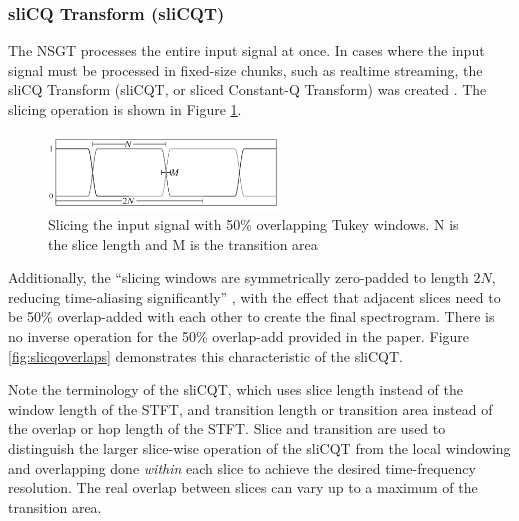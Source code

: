 \documentclass[report.tex]{subfiles}
\begin{document}
\newpagefill

\subsubsection{sliCQ Transform (sliCQT)}
\label{sec:theoryslicqt}

The NSGT processes the entire input signal at once. In cases where the input signal must be processed in fixed-size chunks, such as realtime streaming, the sliCQ Transform (sliCQT, or sliced Constant-Q Transform) was created \parencite{invertiblecqt, slicq}. The slicing operation is shown in Figure \ref{fig:slicqtukeys}.

\begin{figure}[ht]
	\centering
	\includegraphics[width=0.55\textwidth]{./images-misc/slicq_windows.png}
	\caption{Slicing the input signal with 50\% overlapping Tukey windows. N is the slice length and M is the transition area \parencite{slicq}}
	\label{fig:slicqtukeys}
\end{figure}

Additionally, the ``slicing windows are symmetrically zero-padded to length $2N$, reducing time-aliasing significantly'' \parencite[10]{slicq}, with the effect that adjacent slices need to be 50\% overlap-added with each other to create the final spectrogram. There is no inverse operation for the 50\% overlap-add provided in the paper. Figure \ref{fig:slicqoverlaps} demonstrates this characteristic of the sliCQT.

Note the terminology of the sliCQT, which uses slice length instead of the window length of the STFT, and transition length or transition area instead of the overlap or hop length of the STFT. Slice and transition are used to distinguish the larger slice-wise operation of the sliCQT from the local windowing and overlapping done \textit{within} each slice to achieve the desired time-frequency resolution. The real overlap between slices can vary up to a maximum of the transition area.
\end{document}
